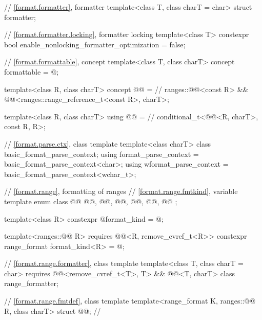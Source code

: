 \begin{codeblock}
{  // \ref{format.formatter}, formatter
  template<class T, class charT = char> struct formatter;

  // \ref{format.formatter.locking}, formatter locking
  template<class T>
    constexpr bool enable_nonlocking_formatter_optimization = false;

  // \ref{format.formattable}, concept 
  template<class T, class charT>
    concept formattable = @\seebelow@;

  template<class R, class charT>
    concept @@ =                                   // \expos
      ranges::@@<const R> &&
      @@<ranges::range_reference_t<const R>, charT>;

  template<class R, class charT>
    using @@ =                                             // \expos
      conditional_t<@@<R, charT>, const R, R>;

  // \ref{format.parse.ctx}, class template 
  template<class charT> class basic_format_parse_context;
  using format_parse_context = basic_format_parse_context<char>;
  using wformat_parse_context = basic_format_parse_context<wchar_t>;

  // \ref{format.range}, formatting of ranges
  // \ref{format.range.fmtkind}, variable template 
  enum class @@ {
    @@,
    @@,
    @@,
    @@,
    @@,
    @@
  };

  template<class R>
    constexpr @\unspec@ format_kind = @\unspec@;

  template<ranges::@@ R>
    requires @@<R, remove_cvref_t<R>>
    constexpr range_format format_kind<R> = @\seebelow@;

  // \ref{format.range.formatter}, class template 
  template<class T, class charT = char>
    requires @@<remove_cvref_t<T>, T> && @@<T, charT>
  class range_formatter;

  // \ref{format.range.fmtdef}, class template 
  template<range_format K, ranges::@@ R, class charT>
    struct @@;                                     // \expos

}
\end{codeblock}
